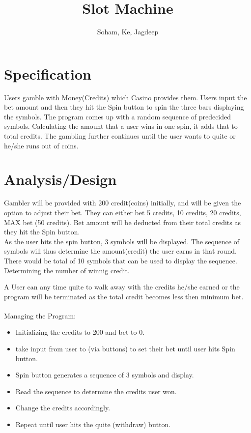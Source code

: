 \documentclass{article}
\title{Slot Machine}
\author{Soham, Ke, Jagdeep}
\begin{document}
\maketitle

\section{Specification}
Users gamble with Money(Credits) which Casino provides them. Users input the bet amount and then they hit the Spin button to spin the three bars displaying the symbols.
The program comes up with a random sequence of predecided symbols.
Calculating the amount that a user wins in one spin, it adds that to total credits.
The gambling further continues until the user wants to quite or he/she runs out of coins.




\section{Analysis/Design}
Gambler will be provided with 200 credit(coins) initially, and will be given the option to adjust their bet. They can either bet 5 credits, 10 credits, 20 credits, MAX bet (50 credits). Bet amount will be deducted from their total credits as they hit the Spin button.\\

As the user hits the spin button, 3 symbols will be displayed. The sequence of symbols will thus determine the amount(credit) the user earns in that round. \\

There would be total of 10 symbols that can be used to display the sequence.\\

Determining the number of winnig credit.


A User can any time quite to walk away with the credits he/she earned or the program will be terminated as the total credit becomes less then minimum bet.\\ \\

Managing the Program:
\begin{itemize}
\item Initializing the credits to 200 and bet to 0.
\item take input from user to (via buttons) to set their bet until user hits Spin button.
\item Spin button generates a sequence of 3 symbols and display.
\item Read the sequence to determine the credits user won.
\item Change the credits accordingly.
\item Repeat until user hits the quite (withdraw) button.
\end{itemize}
\end{document}
